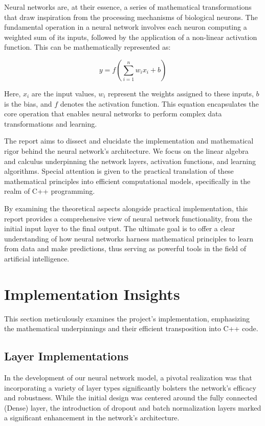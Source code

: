 \documentclass{article}
\begin{document}
Neural networks are, at their essence, a series of mathematical transformations that draw inspiration from the processing mechanisms of biological neurons. The fundamental operation in a neural network involves each neuron computing a weighted sum of its inputs, followed by the application of a non-linear activation function. This can be mathematically represented as:

\begin{equation}
    y = f\left(\sum_{i=1}^{n} w_i x_i + b\right)
\end{equation}

Here, \( x_i \) are the input values, \( w_i \) represent the weights assigned to these inputs, \( b \) is the bias, and \( f \) denotes the activation function. This equation encapsulates the core operation that enables neural networks to perform complex data transformations and learning.

The report aims to dissect and elucidate the implementation and mathematical rigor behind the neural network's architecture. We focus on the linear algebra and calculus underpinning the network layers, activation functions, and learning algorithms. Special attention is given to the practical translation of these mathematical principles into efficient computational models, specifically in the realm of C++ programming.

By examining the theoretical aspects alongside practical implementation, this report provides a comprehensive view of neural network functionality, from the initial input layer to the final output. The ultimate goal is to offer a clear understanding of how neural networks harness mathematical principles to learn from data and make predictions, thus serving as powerful tools in the field of artificial intelligence.


\section{Implementation Insights}

This section meticulously examines the project's implementation, emphasizing the mathematical underpinnings and their efficient transposition into C++ code.

\subsection{Layer Implementations}

In the development of our neural network model, a pivotal realization was that incorporating a variety of layer types significantly bolsters the network's efficacy and robustness. While the initial design was centered around the fully connected (Dense) layer, the introduction of dropout and batch normalization layers marked a significant enhancement in the network's architecture.
\end{document}
